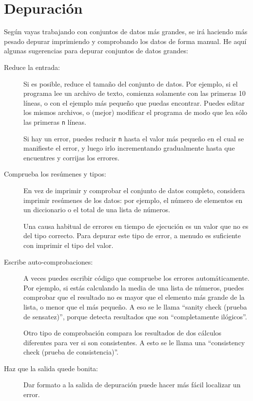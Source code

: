 \section{Depuración}

Según vayas trabajando con conjuntos de datos más grandes, se irá haciendo más
pesado depurar imprimiendo y comprobando los datos de forma manual. He aquí algunas
sugerencias para depurar conjuntos de datos grandes:

\begin{description}

\item[Reduce la entrada:] Si es posible, reduce el tamaño del
conjunto de datos. Por ejemplo, si el programa lee un archivo de texto,
comienza solamente con las primeras 10 líneas, o con el ejemplo más pequeño
que puedas encontrar. Puedes editar los mismos archivos, o (mejor) modificar el
programa de modo que lea sólo las primeras {\tt n} líneas.

Si hay un error, puedes reducir {\tt n} hasta el valor
más pequeño en el cual se manifieste el error, y luego irlo incrementando gradualmente
hasta que encuentres y corrijas los errores.

\item[Comprueba los resúmenes y tipos:] En vez de imprimir y comprobar el
conjunto de datos completo, considera imprimir resúmenes de los datos: por ejemplo,
el número de elementos en un diccionario o el total de una lista de números.

Una causa habitual de errores en tiempo de ejecución es un valor que no es del tipo
correcto. Para depurar este tipo de error, a menudo es suficiente con imprimir
el tipo del valor.

\item[Escribe auto-comprobaciones:] A veces puedes escribir código que compruebe
los errores automáticamente. Por ejemplo, si estás calculando la
media de una lista de números, puedes comprobar que el resultado no
es mayor que el elemento más grande de la lista, o menor que el más
pequeño. A eso se le llama ``sanity check (prueba de sensatez)'', porque detecta
resultados que son ``completamente ilógicos''.


Otro tipo de comprobación compara los resultados de dos cálculos
diferentes para ver si son consistentes. A esto se le llama una
``consistency check (prueba de consistencia)''.

\item[Haz que la salida quede bonita:] Dar formato a la salida de depuración
puede hacer más fácil localizar un error.

\end{description}

